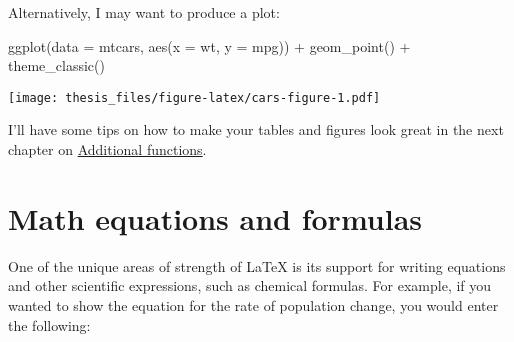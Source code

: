 \documentclass[12pt, oneside]{queensuthesis}
\numberwithin{equation}{chapter}       %
\newenvironment{Shaded}{\begin{snugshade}}{\end{snugshade}}
\newcommand{\AttributeTok}[1]{\textcolor[rgb]{0.77,0.63,0.00}{#1}}
\newcommand{\FunctionTok}[1]{\textcolor[rgb]{0.00,0.00,0.00}{#1}}
\newcommand{\NormalTok}[1]{#1}
\newcommand{\SpecialCharTok}[1]{\textcolor[rgb]{0.00,0.00,0.00}{#1}}
\begin{document}
\begin{table}
\centering
{}
\end{table}
Alternatively, I may want to produce a plot:
\begin{Shaded}
\begin{Highlighting}[]
\FunctionTok{ggplot}\NormalTok{(}\AttributeTok{data =}\NormalTok{ mtcars, }\FunctionTok{aes}\NormalTok{(}\AttributeTok{x =}\NormalTok{ wt, }\AttributeTok{y =}\NormalTok{ mpg)) }\SpecialCharTok{+}
  \FunctionTok{geom\_point}\NormalTok{() }\SpecialCharTok{+}
  \FunctionTok{theme\_classic}\NormalTok{()}
\end{Highlighting}
\end{Shaded}
\texttt{[image: thesis\_files/figure-latex/cars-figure-1.pdf]}

I'll have some tips on how to make your tables and figures look great in the next chapter on \protect\hyperlink{additional-functions}{Additional functions}.

\hypertarget{math-equations-and-formulas}{%
\section{Math equations and formulas}\label{math-equations-and-formulas}}

One of the unique areas of strength of LaTeX is its support for writing equations and other scientific expressions, such as chemical formulas. For example, if you wanted to show the equation for the rate of population change, you would enter the following:
\end{document}

